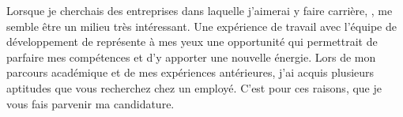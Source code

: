 \vfill
Lorsque je cherchais des entreprises dans laquelle j'aimerai y faire carrière, \Entreprise, me semble être un milieu très intéressant.
Une expérience de travail avec l'équipe de développement
de \Entreprise représente à mes yeux une opportunité qui permettrait de
parfaire mes compétences et d'y apporter une nouvelle énergie.
Lors de mon parcours académique et de mes expériences antérieures, j'ai acquis
plusieurs aptitudes que vous recherchez chez un employé.
C'est pour ces raisons, que je vous fais parvenir ma candidature.
